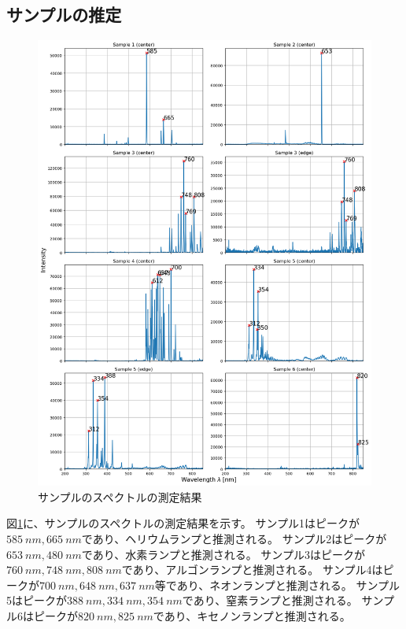 \documentclass[a4paper]{ltjsarticle}
\begin{document}
\subsection{サンプルの推定}
\begin{figure}
    \centering
    \includegraphics[width=0.98\columnwidth]{./images/spectrum_samples.png}
    \caption{サンプルのスペクトルの測定結果}
    \label{fig:spectrum_samples}
\end{figure}
図\ref{fig:spectrum_samples}に、サンプルのスペクトルの測定結果を示す。
サンプル1はピークが$\SI{585}{nm}, \SI{665}{nm}$であり、ヘリウムランプと推測される。
サンプル2はピークが$\SI{653}{nm}, \SI{480}{nm}$であり、水素ランプと推測される。
サンプル3はピークが$\SI{760}{nm}, \SI{748}{nm}, \SI{808}{nm}$であり、アルゴンランプと推測される。
サンプル4はピークが$\SI{700}{nm}, \SI{648}{nm}, \SI{637}{nm}$等であり、ネオンランプと推測される。
サンプル5はピークが$\SI{388}{nm}, \SI{334}{nm}, \SI{354}{nm}$であり、窒素ランプと推測される。
サンプル6はピークが$\SI{820}{nm}, \SI{825}{nm}$であり、キセノンランプと推測される。
\end{document}
